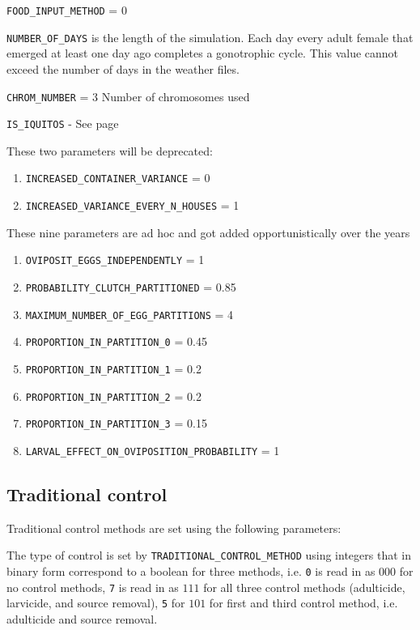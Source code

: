 \documentclass[11pt]{article}
\newcommand{\linecmd}[1]{\texttt{#1}}
\begin{document}

\linecmd{FOOD\_INPUT\_METHOD} = 0

\linecmd{NUMBER\_OF\_DAYS} is the length of the simulation. Each day every adult female that emerged at least one day ago completes a gonotrophic cycle. This value cannot exceed the number of days in the weather files.

\linecmd{CHROM\_NUMBER} = 3 Number of chromosomes used

\linecmd{IS\_IQUITOS} - See page \pageref{IsIquitos} 

\bigskip{}

These two parameters will be deprecated:
\begin{enumerate}
	\item \linecmd{INCREASED\_CONTAINER\_VARIANCE} = 0
	\item \linecmd{INCREASED\_VARIANCE\_EVERY\_N\_HOUSES} = 1
\end{enumerate}

These nine parameters are ad hoc and got added opportunistically over the years
\begin{enumerate}
	\item \linecmd{OVIPOSIT\_EGGS\_INDEPENDENTLY} = 1
	\item \linecmd{PROBABILITY\_CLUTCH\_PARTITIONED} = 0.85
	\item \linecmd{MAXIMUM\_NUMBER\_OF\_EGG\_PARTITIONS} = 4
	\item \linecmd{PROPORTION\_IN\_PARTITION\_0} = 0.45
	\item \linecmd{PROPORTION\_IN\_PARTITION\_1}  = 0.2
	\item \linecmd{PROPORTION\_IN\_PARTITION\_2}  = 0.2
	\item \linecmd{PROPORTION\_IN\_PARTITION\_3}  = 0.15
	\item \linecmd{LARVAL\_EFFECT\_ON\_OVIPOSITION\_PROBABILITY} = 1
\end{enumerate}

\subsection{Traditional control}\label{Traditionalcontrol}

Traditional control methods are set using the following parameters:

The type of control is set by \linecmd{TRADITIONAL\_CONTROL\_METHOD} using integers that in binary form correspond to a boolean for three methods, i.e. \linecmd{0} is read in as $000$ for no control methods, \linecmd{7} is read in as $111$ for all three control methods (adulticide, larvicide, and source removal), \linecmd{5} for $101$ for first and third control method, i.e. adulticide and source removal.
\end{document}
